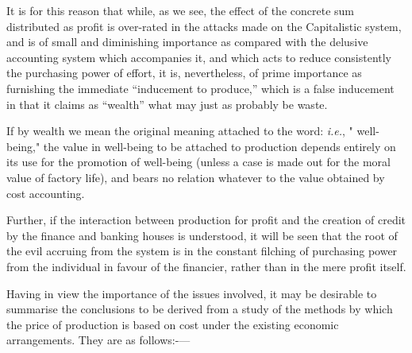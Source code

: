 \documentclass{book}
\begin{document}
It is for this reason that while, as we see, the effect of the concrete sum distributed as profit is over-rated in the attacks made on the Capitalistic system, and is of small and diminishing importance as compared with the delusive accounting system which accompanies it, and which acts to reduce consistently the purchasing power of effort, it is, nevertheless, of prime importance as furnishing the immediate “inducement to produce,” which is a false inducement in that it claims as “wealth” what may just as probably be waste.

If by wealth we mean the original meaning attached to the word: \emph{i.e.}, " well-being," the value in well-being to be attached to production depends entirely on its use for the promotion of well-being (unless a case is made out for the moral value of factory life), and bears no relation whatever to the value obtained by cost accounting.

Further, if the interaction between production for profit and the creation of credit by the finance and banking houses is understood, it will be seen that the root of the evil accruing from the system is in the constant filching of purchasing power from the individual in favour of the financier, rather than in the mere profit itself.

Having in view the importance of the issues involved, it may be desirable to summarise the conclusions to be derived from a study of the methods by which the price of production is based on cost under the existing economic arrangements. They are as follows:-—
\end{document}
